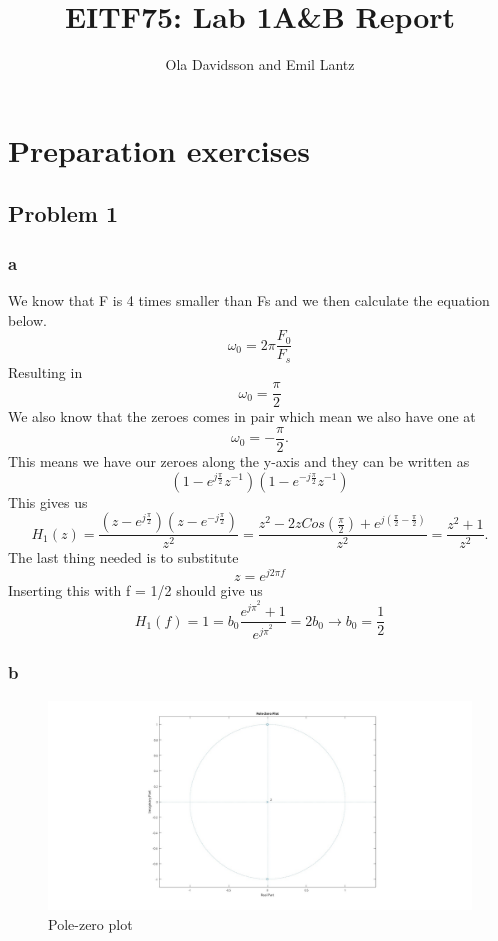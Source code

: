 \documentclass[a4paper,11pt]{article}
\title{EITF75: Lab 1A&B Report}
\author{Ola Davidsson and Emil Lantz}
\begin{document}
\raggedright
\maketitle
\section{Preparation exercises}
\subsection{Problem 1}
\subsubsection{a}

We know that F is 4 times smaller than Fs and we then calculate the equation below. 
\[
\omega_{0} = 2 \pi \frac{F_{0}}{F_{s}} 
\]
Resulting in
\[
\omega_{0} = \frac{\pi}{2}
\]
We also know that the zeroes comes in pair which mean we also have one at 
\[
\omega_{0} = -\frac{\pi}{2}.
\]
This means we have our zeroes along the y-axis and they can be written as
\[
(1-e^{j\frac{\pi}{2}}z^{-1})(1-e^{-j\frac{\pi}{2}}z^{-1})
\]
This gives us
\[
H_{1}(z) = \frac{(z-e^{j\frac{\pi}{2}})(z-e^{-j\frac{\pi}{2}})}{z^2} = \frac{z^2-2zCos(\frac{\pi}{2})+e^{j(\frac{\pi}{2}-\frac{\pi}{2})}}{z^2} = \frac{z^2+1}{z^2}.
\]
The last thing needed is to substitute 
\[
z = e^{j2\pi f} 
\]
Inserting this with f = 1/2 should give us 
\[
H_{1}(f) = 1 =  b_0\frac{e^{j\pi}^2 + 1}{e^{j\pi}^2} = 2b_0 \xrightarrow{} b_0 = \frac{1}{2}
\]
\subsubsection{b}
\begin{figure}[H]
    \hspace{-2.5cm}\includegraphics[scale = 0.3]{./images/pz-p1.jpg}
    \caption{Pole-zero plot}
\end{figure}
\end{document}
